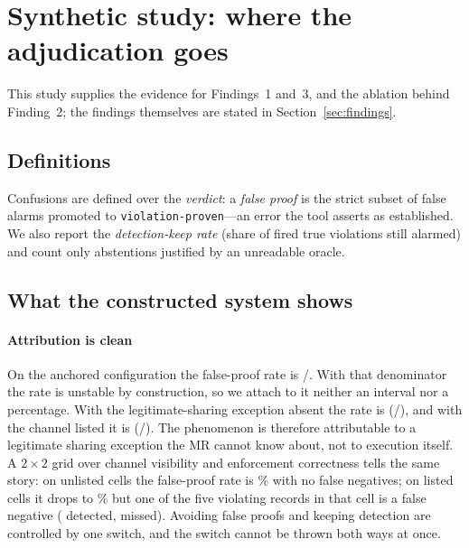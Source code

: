 \section{Synthetic study: where the adjudication goes}
\label{sec:synthetic}

This study supplies the evidence for Findings~1 and~3, and the ablation behind
Finding~2; the findings themselves are stated in Section~\ref{sec:findings}.

\subsection{Definitions}
\label{sec:metrics}

Confusions are defined over the \emph{verdict}: a \emph{false proof} is the strict
subset of false alarms promoted to \texttt{violation-proven}---an error the tool
asserts as established. We also report the \emph{detection-keep rate} (share of fired
true violations still alarmed) and count only abstentions justified by an unreadable
oracle.

\subsection{What the constructed system shows}

\paragraph{Attribution is clean} On the anchored configuration the false-proof rate
is \ResFpEthreeHits{}/\ResFpEthreeTotal{}. With that denominator the rate is unstable
by construction, so we attach to it neither an interval nor a percentage. With the
legitimate-sharing exception absent the rate is \ResBaseFpRate{}
(\ResBaseFpHits{}/\ResBaseFpTotal{}), and with the channel listed it is
\ResListedCtlFpRate{} (\ResListedCtlFpHits{}/\ResListedCtlFpTotal{}). The phenomenon
is therefore attributable to a legitimate sharing exception the MR cannot know
about, not to execution itself. A $2{\times}2$ grid over channel visibility and
enforcement correctness tells the same story: on unlisted cells the false-proof rate
is \ResBEThreevulnZerounlistedFpPct{}\% with no false negatives; on listed cells it
drops to \ResBEThreevulnZerolistedFpPct{}\% but one of the five violating records in
that cell is a false negative (\ResBEThreevulnOnelistedTp{} detected,
\ResBEThreevulnOnelistedFn{} missed). Avoiding false proofs and keeping detection are
controlled by one switch, and the switch cannot be thrown both ways at once.

